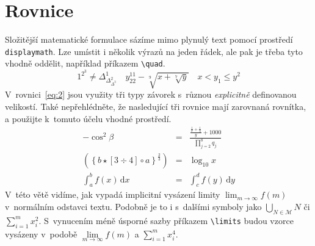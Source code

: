 \documentclass[twocolumn,a4paper,11pt]{article}
\theoremstyle{definition}
\theoremstyle{plain}
\begin{document}
\section{Rovnice}
\label{sec:rovnice}
Složitější matematické formulace sázíme mimo plynulý text pomocí prostředí \verb|displaymath|. Lze umístit i několik výrazů na jeden řádek, ale pak je třeba tyto vhodně oddělit, například příkazem \verb|\quad|.
\[1^{2^3}\neq \Delta^1_{\Delta^2_{\Delta^3}}\quad y^{11}_{22}-\sqrt[9]{x+\sqrt[7]{y}}\quad x < y_1\leq y^2\]
V~rovnici~\eqref{eq:2} jsou využity tři typy závorek s~různou \emph{explicitně} definovanou velikostí. Také nepřehlédněte, že nasledující tři rovnice mají zarovnaná rovnítka, a použijte k~tomuto účelu vhodné prostředí.
\begin{eqnarray}
    \label{eq:1}
    -\cos^2\beta & = & \frac{\frac{\frac{1}{x}+\frac{1}{3}}{y}+1000}{\prod\limits_{j=2}^8 q_j} \\
    \label{eq:2}
    \left(\left\{b\star[3 \div 4]\circ a\right\}^\frac{2}{3}\right) & = & \log_{10} x \\
    \label{eq:3}
    \int_a^b f(x)\,\mathrm{d}x & = & \int_c^d f(y)\,\mathrm{d}y
\end{eqnarray}
V~této větě vidíme, jak vypadá implicitní vysázení limity $\lim_{m \to \infty} f(m)$ v~normálním odstavci textu. Podobně je to i s~dalšími symboly jako $\bigcup_{N\in\mathcal{M}} N$ či $\sum^{m}_{i=1} x^2_i$.
S~vynucením méně úsporné sazby příkazem \verb|\limits| budou vzorce vysázeny v~podobě $\lim\limits_{m\to \infty} f(m)$ a $\sum\limits_{i=1}^{m} x^{4}_{i}$.
\end{document}
